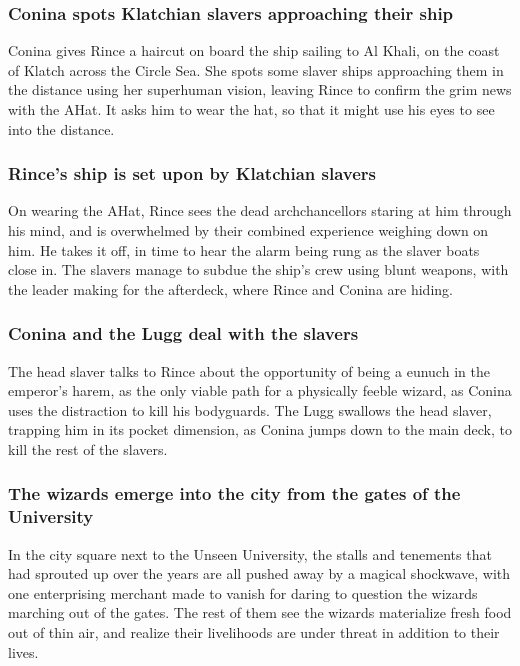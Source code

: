 \subsubsection{\Gls{Conina} spots Klatchian slavers approaching their ship}
\Gls{Conina} gives \Gls{Rince} a haircut on board the ship sailing to Al Khali, on the coast of
Klatch across the Circle Sea. She spots some slaver ships approaching them in the distance using
her superhuman vision, leaving \Gls{Rince} to confirm the grim news with the \Gls{AHat}. It asks
him to wear the hat, so that it might use his eyes to see into the distance.

\subsubsection{\Gls{Rince}'s ship is set upon by Klatchian slavers}
On wearing the \Gls{AHat}, \Gls{Rince} sees the dead archchancellors staring at him through his
mind, and is overwhelmed by their combined experience weighing down on him. He takes it off, in
time to hear the alarm being rung as the slaver boats close in. The slavers manage to subdue the
ship's crew using blunt weapons, with the leader making for the afterdeck, where \Gls{Rince}
and \Gls{Conina} are hiding.

\subsubsection{\Gls{Conina} and the \Gls{Lugg} deal with the slavers}
The head slaver talks to \Gls{Rince} about the opportunity of being a eunuch in the emperor's
harem, as the only viable path for a physically feeble wizard, as \Gls{Conina} uses the distraction
to kill his bodyguards. The \Gls{Lugg} swallows the head slaver, trapping him in its pocket
dimension, as \Gls{Conina} jumps down to the main deck, to kill the rest of the slavers.

\subsubsection{The wizards emerge into the city from the gates of the University}
In the city square next to the Unseen University, the stalls and tenements that had sprouted up
over the years are all pushed away by a magical shockwave, with one enterprising merchant made to
vanish for daring to question the wizards marching out of the gates. The rest of them see the
wizards materialize fresh food out of thin air, and realize their livelihoods are under threat in
addition to their lives.


